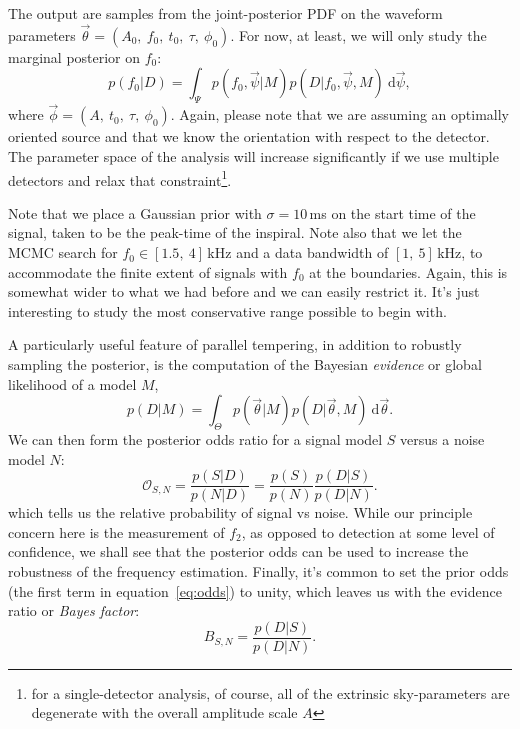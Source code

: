 \documentclass[showpacs, superscriptaddress, showpacs, letterpaper, showkeys,
preprintnumbers, altaffilletter, amssymb, amsmath, amsfonts, prd,
onecolumn, floatfix, nofootinbib]{revtex4-1}
\newcommand{\diff}{{\mathrm d}}
\begin{document}
The output are samples from the joint-posterior PDF on the waveform parameters
$\vec{\theta} = (A_0,~f_0,~t_0,~\tau,~\phi_0)$.  For now, at least, we will only
study the marginal posterior on $f_0$:  
\begin{equation}\label{eq:freq_posterior}
p(f_0|D) = \int_{\Psi} p(f_0, \vec{\psi}|M)
p(D|f_0,\vec{\psi},M)~\diff\vec{\psi},
\end{equation}
%
where $\vec{\phi} = (A,~t_0,~\tau,~\phi_0)$.  Again, please note that we are
assuming an optimally oriented source and that we know the orientation with
respect to the detector.  The parameter space of the analysis will increase
significantly if we use multiple detectors and relax that
constraint\footnote{for a single-detector analysis, of course, all of the
extrinsic sky-parameters are degenerate with the overall amplitude scale $A$}.

Note that we place a Gaussian prior with $\sigma=10$\,ms on
the start time of the signal, taken to be the peak-time of the inspiral.  Note
also that we let the MCMC search for $f_0 \in [1.5,~4]$\,kHz and a data
bandwidth of $[1,~5]$\,kHz, to accommodate the finite extent of signals with
$f_0$ at the boundaries.   Again, this is somewhat wider to what we had before
and we can easily restrict it.  It's just interesting to study the most
conservative range possible to begin with.

A particularly useful feature of parallel tempering, in addition to robustly
sampling the posterior, is the computation of the Bayesian \emph{evidence} or
global likelihood of a model $M$,
\begin{equation}\label{eq:evidence}
p(D|M) = \int_{\Theta} p(\vec{\theta}|M)p(D|\vec{\theta}, M)~\diff \vec{\theta}.
\end{equation}
%
We can then form the posterior odds ratio for a signal model $S$ versus a noise
model $N$:
\begin{equation}\label{eq:odds}
\mathcal{O}_{S,N} = \frac{p(S|D)}{p(N|D)} =
\frac{p(S)}{p(N)}\frac{p(D|S)}{p(D|N)}.
\end{equation}
%
which tells us the relative probability of signal vs noise.  While our principle
concern here is the measurement of $f_2$, as opposed to detection at some level
of confidence, we shall see that the posterior odds can be used to increase the
robustness of the frequency estimation.   Finally, it's common to set the prior
odds (the first term in equation~\ref{eq:odds}) to unity, which leaves us with
the evidence ratio or \emph{Bayes factor}:
\begin{equation}\label{eq:bfac}
B_{S,N} = \frac{p(D|S)}{p(D|N)}.
\end{equation}
\end{document}
